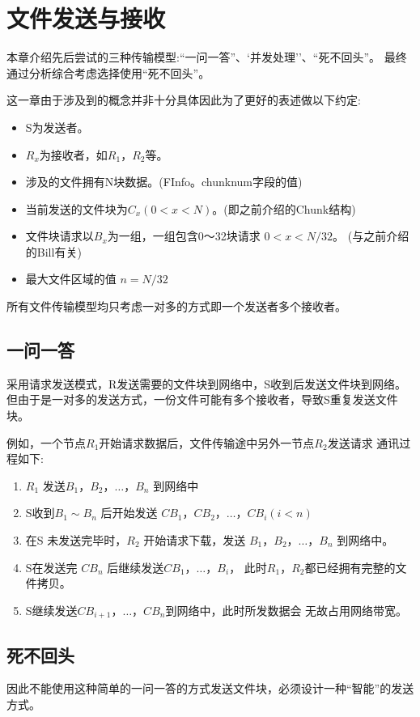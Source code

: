 \chapter{文件发送与接收}
本章介绍先后尝试的三种传输模型:``一问一答''、`并发处理''、``死不回头''。
最终通过分析综合考虑选择使用``死不回头''。

这一章由于涉及到的概念并非十分具体因此为了更好的表述做以下约定:
\begin{itemize}
	\item S为发送者。
	\item $R_x$为接收者，如$R_1，R_2$等。
	\item 涉及的文件拥有N块数据。(FInfo。chunknum字段的值)
	\item 当前发送的文件块为$C_x (0<x<N)$。(即之前介绍的Chunk结构)
	\item 文件块请求以$B_x$为一组，一组包含0～32块请求
		$0 < x < N/32$。 (与之前介绍的Bill有关)
	\item 最大文件区域的值 $n = N/32$
\end{itemize}
所有文件传输模型均只考虑一对多的方式即一个发送者多个接收者。

\section{一问一答}
采用请求发送模式，R发送需要的文件块到网络中，S收到后发送文件块到网络。
但由于是一对多的发送方式，一份文件可能有多个接收者，导致S重复发送文件块。

例如，一个节点$R_1$开始请求数据后，文件传输途中另外一节点$R_2$发送请求
通讯过程如下:
\begin{enumerate}
	\item $R_1$ 发送$B_1，B_2，\ldots，B_n$ 到网络中
	\item S收到$B_1\sim B_n$ 后开始发送
		$CB_1，CB_2，\ldots，CB_i (i < n)$
	\item 在S 未发送完毕时，$R_2$ 开始请求下载，发送
		$B_1，B_2，\ldots，B_n$ 到网络中。
	\item S在发送完 $CB_n$ 后继续发送$CB_1，\ldots，B_i$，
		此时$R_1，R_2$都已经拥有完整的文件拷贝。
	\item S继续发送$CB_{i+1}，\ldots，CB_n$到网络中，此时所发数据会
		无故占用网络带宽。
\end{enumerate}

\section{死不回头}
因此不能使用这种简单的一问一答的方式发送文件块，必须设计一种``智能''的发送方式。

